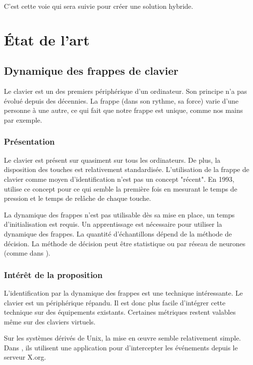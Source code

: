 \documentclass[conference,compsoc]{IEEEtran}
\begin{document}
C'est cette voie qui sera suivie pour créer une solution hybride.

\section{État de l'art}

\subsection{Dynamique des frappes de clavier}

Le clavier est un des premiers périphérique d'un ordinateur. Son principe n'a pas évolué depuis des décennies. La frappe (dans son rythme, sa force) varie d'une personne à une autre, ce qui fait que notre frappe est unique, comme nos mains par exemple.

\subsubsection{Présentation}

Le clavier est présent sur quasiment sur tous les ordinateurs. De plus, la disposition des touches est relativement standardisée.
L'utilisation de la frappe de clavier comme moyen d'identification n'est pas un concept "récent". En 1993, \cite{brown1993user} utilise ce concept pour ce qui semble la première fois en mesurant le temps de pression et le temps de relâche de chaque touche.

La dynamique des frappes n'est pas utilisable dès sa mise en place, un temps d'initialisation est requis. Un apprentissage est nécessaire pour utiliser la dynamique des frappes. La quantité d'échantillons dépend de la méthode de décision. La méthode de décision peut être statistique ou par réseau de neurones (comme dans \cite{7435705}).

\subsubsection{Intérêt de la proposition}
L'identification par la dynamique des frappes est une technique intéressante. Le clavier est un périphérique répandu. Il est donc plus facile d'intégrer cette technique sur des équipements existants. Certaines métriques restent valables même sur des claviers virtuels.

Sur les systèmes dérivés de Unix, la mise en \oe{}uvre semble relativement simple. Dans \cite{brown1993user}, ils utilisent une application pour d'intercepter les événements depuis le serveur X.org.
\end{document}
